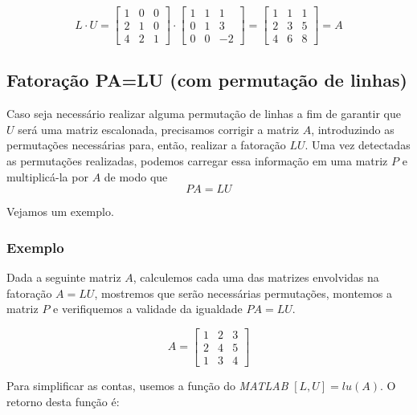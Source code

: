\documentclass[12pt]{article}
\begin{document}
	\begin{equation*}
		L\cdot U=\begin{bmatrix}
			1 & 0 & 0\\
			2 & 1 & 0\\
			4 & 2 & 1
		\end{bmatrix}\cdot
		\begin{bmatrix}
			1 & 1 & 1\\
			0 & 1 & 3\\
			0 & 0 & -2
		\end{bmatrix}=
		\begin{bmatrix}
			1 & 1 & 1\\
			2 & 3 & 5\\
			4 & 6 & 8
		\end{bmatrix}=A
	\end{equation*}
	
	\subsection{Fatoração PA=LU (com permutação de linhas)}
	
	Caso seja necessário realizar alguma permutação de linhas a fim de garantir que $U$ será uma matriz escalonada, precisamos corrigir a matriz $A$, introduzindo as permutações necessárias para, então, realizar a fatoração $LU$. Uma vez detectadas as permutações realizadas, podemos carregar essa informação em uma matriz $P$ e multiplicá-la por $A$ de modo que
	\begin{equation*}
		PA=LU
	\end{equation*}
	
	Vejamos um exemplo.
	
	\subsubsection{Exemplo}
	Dada a seguinte matriz $A$, calculemos cada uma das matrizes envolvidas na fatoração $A=LU$, mostremos que serão necessárias permutações, montemos a matriz $P$ e verifiquemos a validade da igualdade $PA=LU$.
	
	\begin{equation*}
		A=\begin{bmatrix}
			1 & 2 & 3\\
			2 & 4 & 5\\
			1 & 3 & 4
		\end{bmatrix}
	\end{equation*}
	
	Para simplificar as contas, usemos a função do \textit{MATLAB} $[L,U]=lu(A)$. O retorno desta função é:
	
\end{document}
